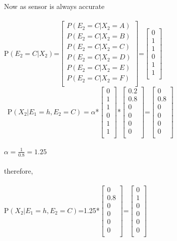 \documentclass[11pt,a4paper]{article}
\begin{document}
Now as sensor is always accurate\\\\
P$(E_{2}=C|X_{2})$=$\begin{bmatrix}
P(E_{2}=C|X_{2}=A)\\
P(E_{2}=C|X_{2}=B)\\
P(E_{2}=C|X_{2}=C)\\
P(E_{2}=C|X_{2}=D)\\
P(E_{2}=C|X_{2}=E)\\
P(E_{2}=C|X_{2}=F)\\
\end{bmatrix}$=$\begin{bmatrix}
0\\
1\\
1\\
0\\
1\\
1\\
\end{bmatrix}$\\\
P$(X_{2}|E_{1}=h, E_{2}=C)=\alpha$*$\begin{bmatrix}
0\\
1\\
1\\
0\\
1\\
1\\
\end{bmatrix}$*$\begin{bmatrix}
0.2\\
0.8\\
0\\
0\\
0\\
0\\
\end{bmatrix}$=\alpha*$\begin{bmatrix}
0\\
0.8\\
0\\
0\\
0\\
0\\
\end{bmatrix}$\\\\
$\alpha=\frac{1}{0.8}=1.25$\\\\
\newpage
therefore,\\\\
P$(X_{2}|E_{1}=h, E_{2}=C)$=1.25*$\begin{bmatrix}
0\\
0.8\\
0\\
0\\
0\\
0\\
\end{bmatrix}$=$\begin{bmatrix}
0\\
1\\
0\\
0\\
0\\
0\\
\end{bmatrix}$
\end{document}
